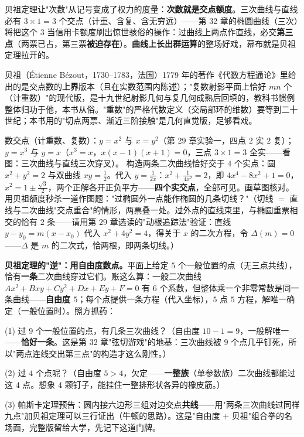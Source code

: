 贝祖定理让"次数"从记号变成了权力的度量：\textbf{次数就是交点额度}。三次曲线与直线必有 $3\times1 = 3$ 个交点（计重、含复、含无穷远）——第 32 章的椭圆曲线（三次）将把这个 $3$ 当信用卡额度刷出惊世骇俗的操作：过曲线上两点作直线，必交\textbf{第三点}（两票已占，第三票\textbf{被迫存在}）。\textbf{曲线上长出群运算}的整场好戏，幕布就是贝祖定理拉开的。

\begin{lishi}
贝祖（\'Etienne B\'ezout，1730--1783，法国）1779 年的著作《代数方程通论》里给出的是交点数的\textbf{上界}版本（且在实数范围内陈述）；"复数射影平面上恰好 $mn$ 个（计重数）"的现代版，是十九世纪射影几何与复几何成熟后回填的，教科书惯例整体归功于他，本书从俗。"重数"的严格代数定义（交局部环的维数）要等到二十世纪；本书用的"切点两票、渐近三阶接触"是几何直觉版，足够看戏。
\end{lishi}

\begin{dongshou}
\begin{itemize}
  \yisi 数交点（计重数、复数）：$y = x^2$ 与 $x = y^2$（第 29 章实验一，四点 $2$ 实 $2$ 复）；$y = x^3$ 与 $y = x$（$x^3 = x$，$x(x-1)(x+1) = 0$，三点 $3\times1 = 3$ 全实——看图：三次曲线与直线三次穿叉）。
  \yier 构造两条二次曲线恰好交于 $4$ 个实点：圆 $x^2 + y^2 = 2$ 与双曲线 $xy = \tfrac12$。代入 $y = \tfrac{1}{2x}$：$x^2 + \tfrac1{4x^2} = 2$，即 $4x^4 - 8x^2 + 1 = 0$，$x^2 = 1 \pm\tfrac{\sqrt3}{2}$，两个正解各开正负平方——\textbf{四个实交点}，全部可见。画草图核对。
  \yier 用贝祖额度秒杀一道作图题："过椭圆外一点能作椭圆的几条切线？"（切线 $=$ 直线与二次曲线"交点重合"的情形，两票叠一处。过外点的直线束里，与椭圆重票相交的恰有 $2$ 条——请用第 29 章选读的"动根追踪法"验证：直线 $y - y_0 = m(x - x_0)$ 代入 $x^2 + 4y^2 = 4$，得关于 $x$ 的二次方程，令 $\Delta(m) = 0$——$\Delta$ 是 $m$ 的二次式，恰两根，即两条切线。）
\end{itemize}
\end{dongshou}

\begin{shaonao}
\textbf{贝祖定理的"逆"：用自由度数点。}平面上给定 $5$ 个一般位置的点（无三点共线），恰有\textbf{一条}二次曲线穿过它们。账这么算：一般二次曲线 $Ax^2 + Bxy + Cy^2 + Dx + Ey + F = 0$ 有 $6$ 个系数，但整体乘一个非零常数是同一条曲线——\textbf{自由度 $5$}；每个点提供一条方程（代入坐标），$5$ 点 $5$ 方程，解唯一确定（一般位置时）。照方抓药：

(1) 过 $9$ 个一般位置的点，有几条三次曲线？（自由度 $10 - 1 = 9$，一般解唯一——\textbf{恰好一条}。这是第 32 章"弦切游戏"的地基：三次曲线被 $9$ 个点几乎钉死，所以"两点连线交出第三点"的构造才这么刚性。）

(2) 过 $4$ 个点呢？（自由度 $5 > 4$，欠定——\textbf{一整族}（单参数族）二次曲线都能过这 $4$ 点。想象 $4$ 颗钉子，能挂住一整排形状各异的橡皮筋。）

(3) 帕斯卡定理预告：圆内接六边形三组对边交点\textbf{共线}——用"两条三次曲线过同样九点"加贝祖定理可以三行证出（牛顿的思路）。这是"自由度 $+$ 贝祖"组合拳的名场面，完整版留给大学，先记下这道门牌。
\end{shaonao}


